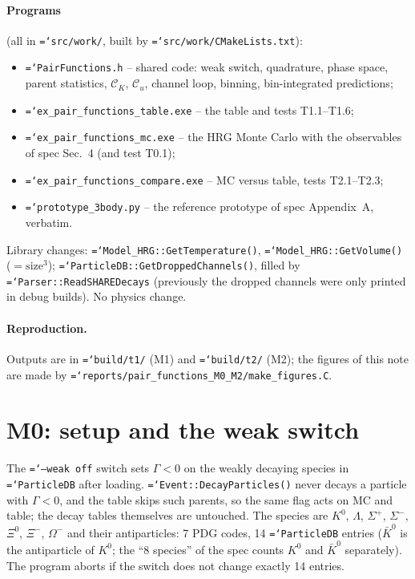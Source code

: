 \documentclass[11pt,a4paper]{article}
\newcommand{\CK}{\mathcal C_K}
\newcommand{\Cu}{\mathcal C_u}
\newcommand{\code}[1]{\texttt{\hyphenchar\font=`\-#1}}
\begin{document}
\paragraph{Programs} (all in \code{src/work/}, built by \code{src/work/CMakeLists.txt}):
\begin{itemize}\itemsep0pt
\item \code{PairFunctions.h} -- shared code: weak switch, quadrature, phase space, parent
  statistics, $\CK$, $\Cu$, channel loop, binning, bin-integrated predictions;
\item \code{ex\_pair\_functions\_table.exe} -- the table and tests T1.1--T1.6;
\item \code{ex\_pair\_functions\_mc.exe} -- the HRG Monte Carlo with the observables of spec Sec.~4
  (and test T0.1);
\item \code{ex\_pair\_functions\_compare.exe} -- MC versus table, tests T2.1--T2.3;
\item \code{prototype\_3body.py} -- the reference prototype of spec Appendix~A, verbatim.
\end{itemize}
Library changes: \code{Model\_HRG::GetTemperature()}, \code{Model\_HRG::GetVolume()} ($=\text{size}^3$);
\code{ParticleDB::GetDroppedChannels()}, filled by \code{Parser::ReadSHAREDecays} (previously the
dropped channels were only printed in debug builds). No physics change.

\paragraph{Reproduction.}
Outputs are in \code{build/t1/} (M1) and \code{build/t2/} (M2); the figures of this note are made
by \code{reports/pair\_functions\_M0\_M2/make\_figures.C}.

\section{M0: setup and the weak switch}

The \code{--weak off} switch sets $\Gamma<0$ on the weakly decaying species in \code{ParticleDB}
after loading. \code{Event::DecayParticles()} never decays a particle with $\Gamma<0$, and the
table skips such parents, so the same flag acts on MC and table; the decay tables themselves are
untouched. The species are $K^0$, $\Lambda$, $\Sigma^+$, $\Sigma^-$, $\Xi^0$, $\Xi^-$, $\Omega^-$
and their antiparticles: 7 PDG codes, 14 \code{ParticleDB} entries ($\bar K^0$ is the
antiparticle of $K^0$; the ``8 species'' of the spec counts $K^0$ and $\bar K^0$ separately). The
program aborts if the switch does not change exactly 14 entries.
\end{document}
